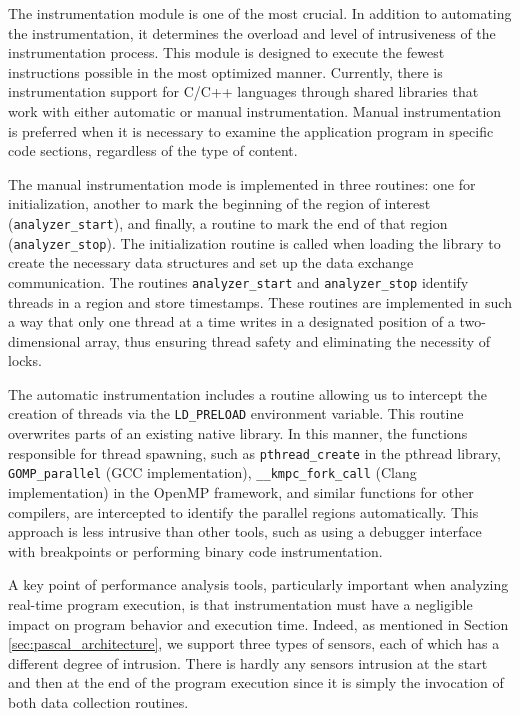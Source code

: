 The instrumentation module is one of the most crucial. In addition to automating the instrumentation, it determines the overload and level of intrusiveness of the instrumentation process. This module is designed to execute the fewest instructions possible in the most optimized manner. Currently, there is instrumentation support for C/C++ languages through shared libraries that work with either automatic or manual instrumentation. Manual instrumentation is preferred when it is necessary to examine the application program in specific code sections, regardless of the type of content. 

The manual instrumentation mode is implemented in three routines: one for initialization, another to mark the beginning of the region of interest ({\tt analyzer\_start}), and finally, a routine to mark the end of that region ({\tt analyzer\_stop}). The initialization routine is called when loading the library to create the necessary data structures and set up the data exchange communication. The routines {\tt analyzer\_start} and {\tt analyzer\_stop} identify threads in a region and store timestamps. These routines are implemented in such a way that only one thread at a time writes in a designated position of a two-dimensional array, thus ensuring thread safety and eliminating the necessity of locks.

The automatic instrumentation includes a routine allowing us to intercept the creation of threads via the {\tt LD\_PRELOAD} environment variable. This routine overwrites parts of an existing native library. In this manner, the functions responsible for thread spawning, such as {\tt pthread\_create} in the pthread library, {\tt GOMP\_parallel} (GCC implementation), {\tt \_\_kmpc\_fork\_call} (Clang implementation) in the OpenMP framework, and similar functions for other compilers, are intercepted to identify the parallel regions automatically. This approach is less intrusive than other tools, such as using a debugger interface with breakpoints or performing binary code instrumentation.

A key point of performance analysis tools, particularly important when analyzing real-time program execution, is that instrumentation must have a negligible impact on program behavior and execution time. Indeed, as mentioned in Section \ref{sec:pascal_architecture}, we support three types of sensors, each of which has a different degree of intrusion.
There is hardly any sensors intrusion at the start and then at the end of the program execution since it is simply the invocation of both data collection routines.

